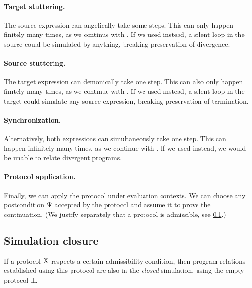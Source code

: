 \paragraph{ Target stuttering.}
The source expression can angelically take some steps.
This can only happen finitely many times, as we continue with \iSimLfp.
If we used \iSimGfp instead, a silent loop in the source could be simulated by anything, breaking preservation of divergence.

\paragraph{ Source stuttering.}
The target expression can demonically take one step.
This can also only happen finitely many times, as we continue with \iSimLfp.
If we used \iSimGfp instead, a silent loop in the target could simulate any source expression, breaking preservation of termination.

\paragraph{ Synchronization.}
Alternatively, both expressions can simultaneously take one step.
This can happen infinitely many times, as we continue with \iSimGfp.
If we used \iSimLfp instead, we would be unable to relate divergent programs.

\paragraph{ Protocol application.}
Finally, we can apply the protocol under evaluation contexts.
We can choose any postcondition $\Psi$ accepted by the protocol and assume it to prove the continuation.
(We justify separately that a protocol is admissible, see \cref{subsec:closure}.)

\subsection{Simulation closure}\label{subsec:closure}

If a protocol $\mathrm{X}$ respects a certain admissibility condition, then program relations established using this protocol are also in the \emph{closed} simulation, using the empty protocol $\bot$.

